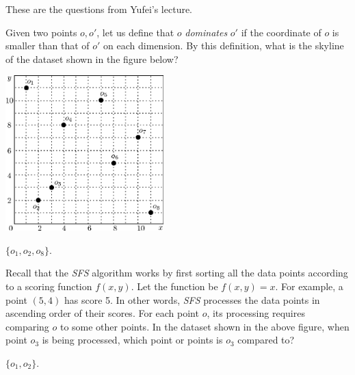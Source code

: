 

\usepackage{amsfonts, amsmath, amssymb, amsthm}
\usepackage{graphicx}





\noindent These are the questions from Yufei's lecture.

 Given two points $o, o'$, let us define that $o$ {\em dominates} $o'$ if the coordinate of $o$ is smaller than that of $o'$ on each dimension. By this definition, what is the skyline of the dataset shown in the figure below?

\begin{center}
    \includegraphics[height=60mm]{./artwork/ds.eps}
\end{center}

 $\{o_1, o_2, o_8\}$.

 Recall that the {\em SFS} algorithm works by first sorting all the data points according to a scoring function $f(x, y)$. Let the function be $f(x, y) = x$. For example, a point $(5, 4)$ has score 5. In other words, {\em SFS} processes the data points in ascending order of their scores. For each point $o$, its processing requires comparing $o$ to some other points. In the dataset shown in the above figure, when point $o_3$ is being processed, which point or points is $o_3$ compared to?

 $\{o_1, o_2\}$.



